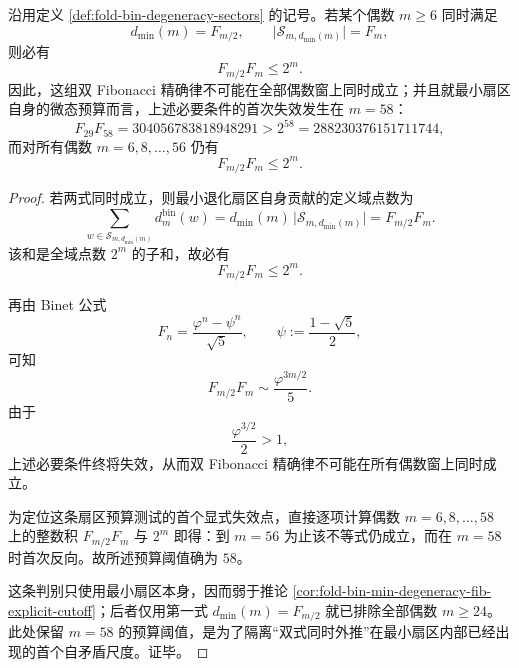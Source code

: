 \begin{theorem}\label{thm:gut-foldbin-double-fibonacci-minsector-budget-threshold}
沿用定义 \ref{def:fold-bin-degeneracy-sectors} 的记号。若某个偶数 \(m\ge 6\) 同时满足
\[
d_{\min}(m)=F_{m/2},
\qquad
\bigl|\mathcal S_{m,d_{\min}(m)}\bigr|=F_m,
\]
则必有
\[
F_{m/2}F_m\le 2^m.
\]
因此，这组双 Fibonacci 精确律不可能在全部偶数窗上同时成立；并且就最小扇区自身的微态预算而言，上述必要条件的首次失效发生在 \(m=58\)：
\[
F_{29}F_{58}=304056783818948291>2^{58}=288230376151711744,
\]
而对所有偶数 \(m=6,8,\dots,56\) 仍有
\[
F_{m/2}F_m\le 2^m.
\]
\end{theorem}
\begin{proof}
若两式同时成立，则最小退化扇区自身贡献的定义域点数为
\[
\sum_{w\in \mathcal S_{m,d_{\min}(m)}} d_m^{\mathrm{bin}}(w)
=
d_{\min}(m)\,\bigl|\mathcal S_{m,d_{\min}(m)}\bigr|
=
F_{m/2}F_m.
\]
该和是全域点数 \(2^m\) 的子和，故必有
\[
F_{m/2}F_m\le 2^m.
\]

再由 Binet 公式
\[
F_n=\frac{\varphi^n-\psi^n}{\sqrt5},
\qquad
\psi:=\frac{1-\sqrt5}{2},
\]
可知
\[
F_{m/2}F_m\sim \frac{\varphi^{3m/2}}{5}.
\]
由于
\[
\frac{\varphi^{3/2}}{2}>1,
\]
上述必要条件终将失效，从而双 Fibonacci 精确律不可能在所有偶数窗上同时成立。

为定位这条扇区预算测试的首个显式失效点，直接逐项计算偶数 \(m=6,8,\dots,58\) 上的整数积 \(F_{m/2}F_m\) 与 \(2^m\) 即得：到 \(m=56\) 为止该不等式仍成立，而在 \(m=58\) 时首次反向。故所述预算阈值确为 \(58\)。

这条判别只使用最小扇区本身，因而弱于推论 \ref{cor:fold-bin-min-degeneracy-fib-explicit-cutoff}；后者仅用第一式 \(d_{\min}(m)=F_{m/2}\) 就已排除全部偶数 \(m\ge 24\)。此处保留 \(m=58\) 的预算阈值，是为了隔离“双式同时外推”在最小扇区内部已经出现的首个自矛盾尺度。证毕。
\end{proof}

